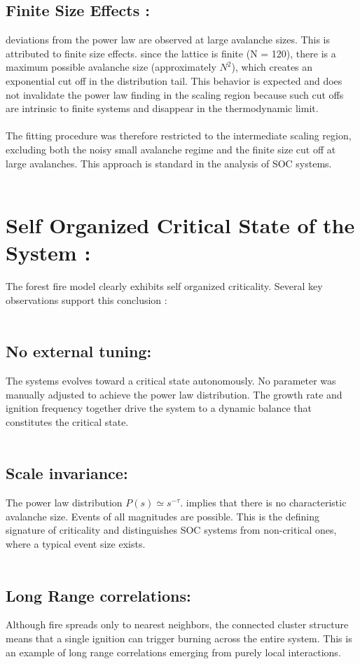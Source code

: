 \documentclass{article}
\begin{document}
\subsection{Finite Size Effects : }
deviations from the power law are observed at large avalanche sizes. This is attributed to finite size effects. since the lattice is finite (N = 120), there is a maximum possible avalanche size (approximately $N^2$), which creates an exponential cut off in the distribution tail. This behavior is expected and does not invalidate the power law finding in the scaling region because such cut offs are intrinsic to finite systems and disappear in the thermodynamic limit. \\
\\
The fitting procedure was therefore restricted to the intermediate scaling region, excluding both the noisy small avalanche regime and the finite size cut off at large avalanches. This approach is standard in the analysis of SOC systems.\\
\\
\section{Self Organized Critical State of the System :}
The forest fire model clearly exhibits self organized criticality. Several key observations support this conclusion :\\
\\
\subsection{No external tuning:}
The systems evolves toward a critical state autonomously. No parameter was manually adjusted to achieve the power law distribution. The growth rate and ignition frequency together drive the system to a dynamic balance that constitutes the critical state.\\
\\
\subsection{Scale invariance: }
The power law distribution $ P(s) \simeq s^{-\tau} $. implies that there is no characteristic avalanche size. Events of all magnitudes are possible. This is the defining signature of criticality and distinguishes SOC systems from non-critical ones, where a typical event size exists.\\
\\
\subsection{Long Range correlations: }
Although fire spreads only to nearest neighbors, the connected cluster structure means that a single ignition can trigger burning across the entire system. This is an example of long range correlations emerging from purely local interactions.\\
\\
\end{document}
